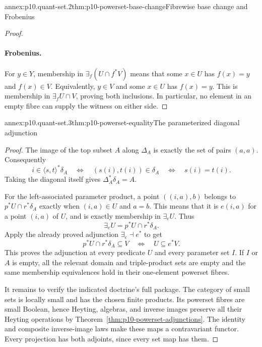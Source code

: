 \begin{annexitem}{annex:p10.quant-set.2}{thm:p10-powerset-base-change}{Fibrewise base change and Frobenius}
\begin{proof}
\paragraph{Frobenius.}
For \(y\in Y\), membership in
\(\exists_f(U\cap f^*V)\) means that some \(x\in U\)
has \(f(x)=y\) and \(f(x)\in V\).
Equivalently, \(y\in V\) and some \(x\in U\) has \(f(x)=y\).
This is membership in \(\exists_fU\cap V\), proving both
inclusions.  In particular, no element in an empty fibre
can supply the witness on either side.
\end{proof}
\end{annexitem}

\begin{annexitem}{annex:p10.quant-set.3}{thm:p10-powerset-equality}{The parameterized diagonal adjunction}
\begin{proof}
The image of the top subset \(A\) along \(\Delta_A\) is
exactly the set of pairs \((a,a)\).
Consequently
\[
 i\in\langle s,t\rangle^*\delta_A
   \quad\Longleftrightarrow\quad
 (s(i),t(i))\in\delta_A
   \quad\Longleftrightarrow\quad s(i)=t(i).
\]
Taking the diagonal itself gives
\(\Delta_A^*\delta_A=A\).

For the left-associated parameter product, a point
\(((i,a),b)\) belongs to \(p^*U\cap r^*\delta_A\) exactly
when \((i,a)\in U\) and \(a=b\).
This means that it is \(e(i,a)\) for a point \((i,a)\)
of \(U\), and is exactly membership in \(\exists_eU\).
Thus
\[
                        \exists_eU=p^*U\cap r^*\delta_A.
\]
Apply the already proved adjunction
\(\exists_e\dashv e^*\) to get
\[
          p^*U\cap r^*\delta_A\subseteq V
              \quad\Longleftrightarrow\quad U\subseteq e^*V.
\]
This proves the adjunction at every predicate \(U\) and
every parameter set \(I\).
If \(I\) or \(A\) is empty, all the relevant domain and
triple-product sets are empty and the same membership
equivalences hold in their one-element powerset fibres.

It remains to verify the indicated doctrine's full package.
The category of small sets is locally small and has the
chosen finite products.  Its powerset fibres are small
Boolean, hence Heyting, algebras, and inverse images
preserve all their Heyting operations by
Theorem~\ref{thm:p10-powerset-adjunctions}.
The identity and composite inverse-image laws make these
maps a contravariant functor.  Every projection has both
adjoints, since every set map has them.


\end{proof}
\end{annexitem}
